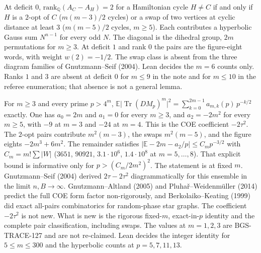 \begin{theorem}
\label{thm:linec-pairs}
At deficit $0$, $\mathrm{rank}_{\mathbb Q}(A_C-A_H)=2$ for a Hamiltonian cycle $H\neq C$ if and only if $H$ is a $2$-opt of $C$ ($m(m-3)/2$ cycles) or a swap of two vertices at cyclic distance at least $3$ ($m(m-5)/2$ cycles, $m\ge 5$). Each contributes a hyperbolic Gauss sum $N^{n-1}$ for every odd $N$. The diagonal is the dihedral group, $2m$ permutations for $m\ge 3$. At deficit $1$ and rank $0$ the pairs are the figure-eight words, with weight $w(2)=-1/2$. The swap class is absent from the three diagram families of Gnutzmann--Seif (2004). Lean decides the $m=6$ counts only. Ranks $1$ and $3$ are absent at deficit $0$ for $m\le 9$ in the note and for $m\le 10$ in the referee enumeration; that absence is not a general lemma.
\end{theorem}

\begin{theorem}
\label{thm:linec-tau2}
For $m\ge 3$ and every prime $p>4^m$,
$\mathbb E\lvert\operatorname{Tr}(DM_p)^m\rvert^2=\sum_{k=0}^{2m-1}a_{m,k}(p)\,p^{-k/2}$ exactly. One has $a_0=2m$ and $a_1=0$ for every $m\ge 3$, and $a_2=-2m^2$ for every $m\ge 5$, with $-9$ at $m=3$ and $-24$ at $m=4$. This is the COE coefficient $-2\tau^2$. The $2$-opt pairs contribute $m^2(m-3)$, the swaps $m^2(m-5)$, and the figure eights $-2m^3+6m^2$. The remainder satisfies $\lvert\mathbb E-2m-a_2/p\rvert\le C_m p^{-3/2}$ with $C_m=m!\sum\lvert W\rvert$ ($3651$, $90921$, $3.1\cdot 10^6$, $1.4\cdot 10^8$ at $m=5,\ldots,8$). That explicit bound is informative only for $p>(C_m/2m^2)^2$. The statement is at fixed $m$. Gnutzmann--Seif (2004) derived $2\tau-2\tau^2$ diagrammatically for this ensemble in the limit $n,B\to\infty$. Gnutzmann--Altland (2005) and Pluha\v{r}--Weidenm\"uller (2014) predict the full COE form factor non-rigorously, and Berkolaiko--Keating (1999) did exact all-pairs combinatorics for random-phase star graphs. The coefficient $-2\tau^2$ is not new. What is new is the rigorous fixed-$m$, exact-in-$p$ identity and the complete pair classification, including swaps. The values at $m=1,2,3$ are BGS-TRACE-127 and are not re-claimed. Lean decides the integer identity for $5\le m\le 300$ and the hyperbolic counts at $p=5,7,11,13$.
\end{theorem}

